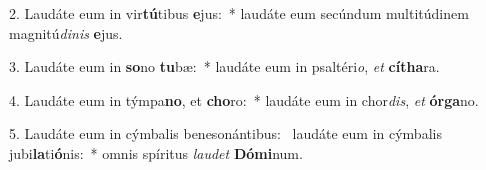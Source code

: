2. Laudáte eum in vir\textbf{tú}tibus \textbf{e}jus:~*  laudáte eum secúndum multitúdinem magnitú\textit{di}\textit{nis} \textbf{e}jus.\

3. Laudáte eum in \textbf{so}no \textbf{tu}bæ:~*  laudáte eum in psaltéri\textit{o}, \textit{et} \textbf{cí}\textbf{tha}ra.\

4. Laudáte eum in týmpa\textbf{no}, et \textbf{cho}ro:~*  laudáte eum in chor\textit{dis}, \textit{et} \textbf{ór}\textbf{ga}no.\

5. Laudáte eum in cýmbalis benesonántibus: \dag\  laudáte eum in cýmbalis jubi\textbf{la}ti\textbf{ó}nis:~*  omnis spíritus \textit{lau}\textit{det} \textbf{Dó}\textbf{mi}num.\

